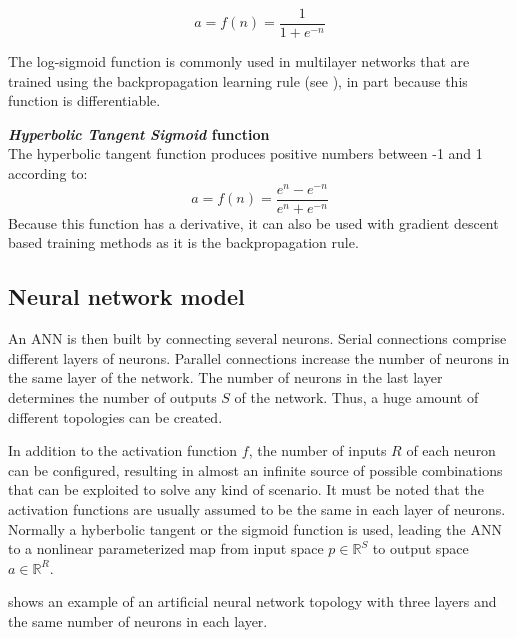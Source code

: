 \begin{description}
{	\begin{equation}
	a = f(n) = \frac{1}{1+e^{-n}}
	\label{eq:logsig}
	\end{equation}

	The log-sigmoid function is commonly used in multilayer
	networks that are trained using the backpropagation learning
	rule (see ), in part because this
	function is differentiable.

	}
	\item{\textbf{\emph{Hyperbolic Tangent Sigmoid} function}\hfill \\
	The hyperbolic tangent function produces positive numbers between -1 and 1 according to:
	\begin{equation}
	a = f(n) = \frac{e^{n}-e^{-n}}{e^{n}+e^{-n}}
	\label{eq:tansig}
	\end{equation}
	Because this function has a derivative, it can also be used with gradient descent based training methods as it is the backpropagation rule.
	}

\end{description}






\subsection{Neural network model}
\label{subsec:neuralnetworkmodel}

An ANN is then built by connecting several neurons.  Serial
connections comprise different layers of neurons.  Parallel
connections increase the number of neurons in the same layer of the
network.  The number of neurons in the last layer determines the
number of outputs $S$ of the network. Thus, a huge amount of different
topologies can be created.

In addition to the activation function $f$, the number of inputs $R$
of each neuron can be configured, resulting in almost an infinite
source of possible combinations that can be exploited to solve any
kind of scenario.  It must be noted that the activation functions are
usually assumed to be the same in each layer of neurons.  Normally a
hyberbolic tangent or the sigmoid function is used, leading the ANN to
a nonlinear parameterized map from input space $p\in\mathbb{R}^S$ to
output space $a\in\mathbb{R}^R$.

 shows an example of an artificial neural network topology with three layers and the same number of neurons in each layer. 

